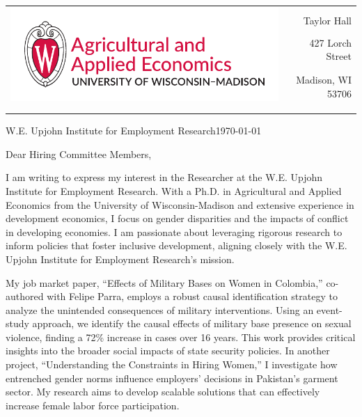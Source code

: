 \documentclass[12pt]{letter}
\begin{document}
\begin{tabularx}{\textwidth}{Xr}
\multirow{4}{*}{\includegraphics[height=3\baselineskip]{logo_cropped.pdf}} &  \\
& Taylor Hall \\
& 427 Lorch Street \\
& Madison, WI 53706 \\
[-1.8ex]\\
\\
\end{tabularx}

\newcommand{\instName}{W.E. Upjohn Institute for Employment Research}
\newcommand{\posName}{Researcher}


\instName \hfill \today \\

\medskip

Dear Hiring Committee Members,

I am writing to express my interest in the \posName \hspace{1mm} at the \instName. 
With a Ph.D. in Agricultural and Applied Economics from the University of Wisconsin-Madison and extensive experience 
in development economics, I focus on gender disparities and the impacts of conflict in developing economies. 
I am passionate about leveraging rigorous research to inform policies that foster inclusive development, 
aligning closely with the \instName's mission.

My job market paper, ``Effects of Military Bases on Women in Colombia,'' co-authored with Felipe Parra, employs 
a robust causal identification strategy to analyze the unintended consequences of military interventions. 
Using an event-study approach, we identify the causal effects of military base presence on sexual violence, finding 
a 72\% increase in cases over 16 years. This work provides critical insights into the broader social impacts of 
state security policies. In another project, ``Understanding the Constraints in Hiring Women,'' I investigate how entrenched gender 
norms influence employers' decisions in Pakistan's garment sector. 
My research aims to develop scalable solutions that can effectively increase female labor force participation.
\end{document}
